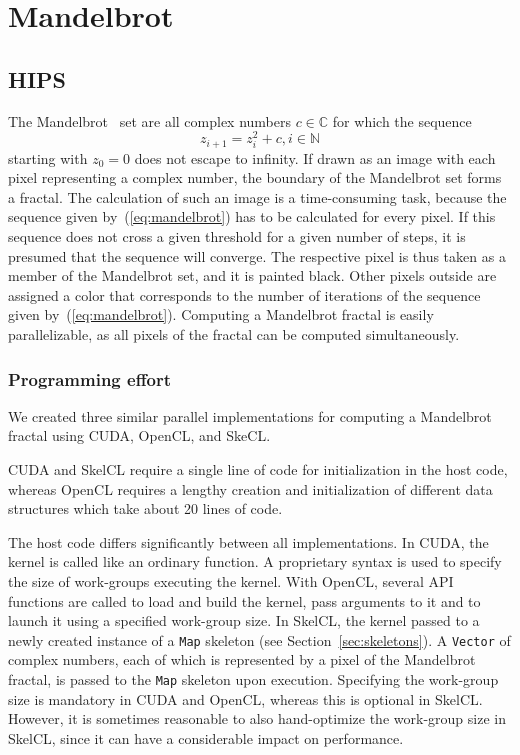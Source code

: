 \section{Mandelbrot}

\subsection{HIPS}
The Mandelbrot~\cite{Mandelbrot-80} set are all complex numbers $c \in {\mathbb C}$ for which the sequence
\begin{equation}
	z_{i+1} = z_{i}^{2} + c, i\in {\mathbb N}
	\label{eq:mandelbrot}
\end{equation}
starting with $z_{0}=0$ does not escape to infinity.
If drawn as an image with each pixel representing a complex number, the boundary of the Mandelbrot set forms a fractal.
The calculation of such an image is a time-consuming task, because the sequence given by~(\ref{eq:mandelbrot}) has to be calculated for every pixel.
If this sequence does not cross a given threshold for a given number of steps, it is presumed that the sequence will converge.
The respective pixel is thus taken as a member of the Mandelbrot set, and it is painted black.
Other pixels outside are assigned a color that corresponds to the number of iterations of the sequence given by~(\ref{eq:mandelbrot}).
Computing a Mandelbrot fractal is easily parallelizable, as all pixels of the fractal can be computed simultaneously.

\subsubsection{Programming effort}
\label{sec:mandelbrot:implementation}

We created three similar parallel implementations for computing a Mandelbrot fractal using CUDA, OpenCL, and SkeCL.

CUDA and SkelCL require a single line of code for initialization in the host code, whereas OpenCL requires a lengthy creation and initialization of different data structures which take about 20 lines of code.

The host code differs significantly between all implementations.
In CUDA, the kernel is called like an ordinary function.
A proprietary syntax is used to specify the size of work-groups executing the kernel.
With OpenCL, several API functions are called to load and build the kernel, pass arguments to it and to launch it using a specified work-group size.
In SkelCL, the kernel passed to a newly created instance of a \texttt{Map} skeleton (see Section~\ref{sec:skeletons}).
A \texttt{Vector} of complex numbers, each of which is represented by a pixel of the Mandelbrot fractal, is passed to the \texttt{Map} skeleton upon execution.
Specifying the work-group size is mandatory in CUDA and OpenCL, whereas this is optional in SkelCL.
However, it is sometimes reasonable to also hand-optimize the work-group size in SkelCL, since it can have a considerable impact on performance.

